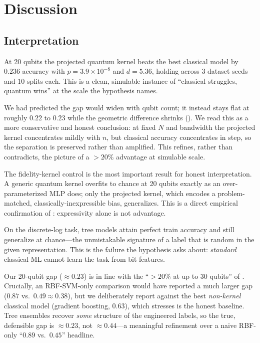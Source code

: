 \section{Discussion}
\label{sec:discussion}

\subsection{Interpretation}

 At 20 qubits the
projected quantum kernel beats the best classical model by $0.236$ accuracy with
$p=3.9\times10^{-8}$ and $d=5.36$, holding across $3$ dataset seeds and $10$
splits each. This is a clean, simulable instance of ``classical struggles,
quantum wins'' at the scale the hypothesis names.

 We had predicted the gap would widen
with qubit count; it instead stays flat at roughly $0.22$ to $0.23$ while the
geometric difference \gdiff{} shrinks (). We read this as a more conservative and
honest conclusion: at fixed $N$ and bandwidth the projected kernel concentrates
mildly with $n$, but classical accuracy concentrates in step, so the separation is
preserved rather than amplified. This refines, rather than contradicts, the
\citet{huang2021power} picture of a $>20\%$ advantage at simulable scale.

 The fidelity-kernel control
is the most important result for honest interpretation. A generic quantum kernel
overfits to chance at 20 qubits exactly as an over-parameterized MLP does; only
the projected kernel, which encodes a problem-matched, classically-inexpressible
bias, generalizes. This is a direct empirical confirmation of
\citet{kubler2021inductive}: expressivity alone is not advantage.

 On the discrete-log task,
tree models attain perfect train accuracy and still generalize at chance---the
unmistakable signature of a label that is random in the given representation. This
is the failure the hypothesis asks about: \emph{standard} classical ML cannot
learn the task from bit features.

 Our 20-qubit gap ($\approx 0.23$) is in line with
the ``$>20\%$ at up to $30$ qubits'' of \citet{huang2021power}. Crucially, an
RBF-SVM-only comparison would have reported a much larger gap ($0.87$ vs.\ $0.49
\approx 0.38$), but we deliberately report against the best \emph{non-kernel}
classical model (gradient boosting, $0.63$), which \citeauthor{huang2021power}
stresses is the honest baseline. Tree ensembles recover \emph{some} structure of
the engineered labels, so the true, defensible gap is $\approx 0.23$, not
$\approx 0.44$---a meaningful refinement over a naive RBF-only ``$0.89$ vs.\
$0.45$'' headline.

